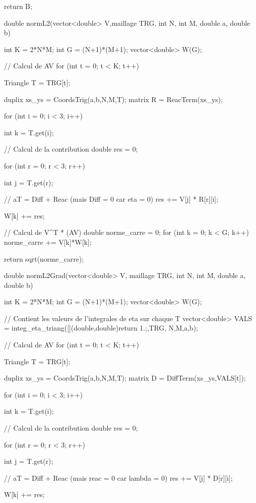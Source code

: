 \begin{codeblock}
{{    return B;
}


double normL2(vector<double> V,maillage TRG, int N, int M, double a, double b){

    int K = 2*N*M;
    int G = (N+1)*(M+1);
    vector<double> W(G);

    // Calcul de AV
    for (int t = 0; t < K; t++){
        Triangle T = TRG[t];

        duplix xs_ys = CoordsTrig(a,b,N,M,T);
        matrix R = ReacTerm(xs_ys);

        for (int i = 0; i < 3; i++){
            int k = T.get(i);

            // Calcul de la contribution
            double res = 0;

            for (int r = 0; r < 3; r++){
                int j = T.get(r);

                // aT = Diff + Reac (mais Diff = 0 car eta = 0)
                res += V[j] * R[r][i];
            }

            W[k] += res;
        }
    }

    // Calcul de V^T * (AV)
    double norme_carre = 0;
    for (int k = 0; k < G; k++)
        norme_carre += V[k]*W[k];

    return sqrt(norme_carre);
}


double normL2Grad(vector<double> V, maillage TRG, int N, int M, double a,
    double b){

    int K = 2*N*M;
    int G = (N+1)*(M+1);
    vector<double> W(G);

    // Contient les valeurs de l'integrales de eta sur chaque T
    vector<double> VALS = integ_eta_triang([](double,double){return 1.;},TRG, N,M,a,b);

    // Calcul de AV
    for (int t = 0; t < K; t++){
        Triangle T = TRG[t];

        duplix xs_ys = CoordsTrig(a,b,N,M,T);
        matrix D = DiffTerm(xs_ys,VALS[t]);

        for (int i = 0; i < 3; i++){
            int k = T.get(i);

            // Calcul de la contribution
            double res = 0;

            for (int r = 0; r < 3; r++){
                int j = T.get(r);

                // aT = Diff + Reac (mais reac = 0 car lambda = 0)
                res += V[j] * D[r][i];
            }

            W[k] += res;
        }
    }

}}
\end{codeblock}
